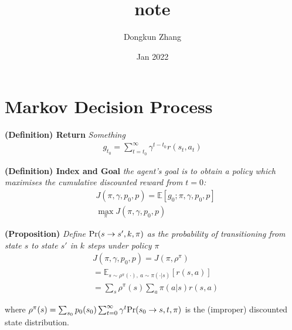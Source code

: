 
\usepackage[utf8]{inputenc}



\title{note}
\author{Dongkun Zhang}
\date{Jan 2022}



\maketitle

\section{Markov Decision Process}



\begin{tcolorbox}
\textbf{
    (Definition) Return
} 
\textit{
    Something
}
\begin{align*}
    g_{t_0} = \sum_{t=t_0}^{\infty}\gamma^{t-t_0}r(s_t,a_t)
\end{align*}
\end{tcolorbox}


\begin{tcolorbox}
\textbf{
    (Definition) Index and Goal
} 
\textit{
    the agent’s goal is to obtain a policy which maximises the cumulative discounted reward from $t=0$: 
}
\begin{align*}
    & J(\pi, \gamma, p_0, p) = \mathbb{E}[ g_0 ;\pi, \gamma, p_0, p] \\
    & \max_{\pi} J(\pi, \gamma, p_0, p)
\end{align*}
\end{tcolorbox}




\begin{tcolorbox}
\textbf{
    (Proposition)
} 
\textit{
    Define $ {\rm{Pr}}(s\to s',k,\pi) $ as the probability of transitioning from state $s$ to state $s'$ in $k$ steps under policy $\pi$
}
\begin{align*}
    & J(\pi, \gamma, p_0, p) = J(\pi, \rho^{\pi}) \\
    &= \mathbb{E}_{s \sim \rho^{\pi}(\cdot), \ a \sim \pi(\cdot|s)}[r(s,a)] \\
    &= \sum_{s} \rho^{\pi}(s) \sum_{a} \pi(a|s) r(s,a)
\end{align*}

where $ \rho^{\pi}(s) = \sum_{s_0} p_0(s_0) \sum_{t=0}^{\infty} \gamma^{t} {\rm{Pr}}(s_0 \to s,t,\pi) $ is the (improper) discounted state distribution.

\end{tcolorbox}


